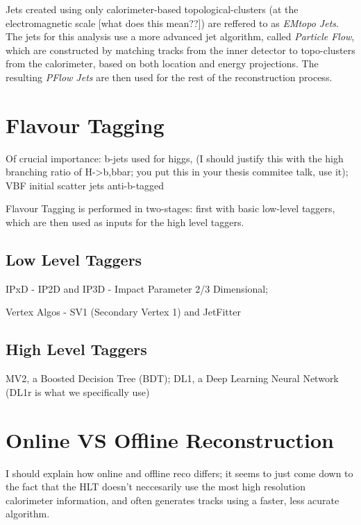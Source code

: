         Jets created using only calorimeter-based topological-clusters (at the electromagnetic scale [what does this mean??]) %
            are reffered to as \textit{EMtopo Jets}.
        The jets for this analysis use a more advanced jet algorithm, called \textit{Particle Flow},
            which are constructed by matching tracks from the inner detector to topo-clusters from the calorimeter,
            based on both location and energy projections.
        The resulting \textit{PFlow Jets} are then used for the rest of the reconstruction process.
        \cite{pflow}
        \cite{jet_energy_scale13TeV}

    \section{Flavour Tagging}
        Of crucial importance:
            b-jets used for higgs,
                (I should justify this with the high branching ratio of H->b,bbar;
                you put this in your thesis commitee talk, use it);
            VBF initial scatter jets anti-b-tagged

        Flavour Tagging is performed in two-stages:
            first with basic low-level taggers,
            which are then used as inputs for the high level taggers.

        \subsection{Low Level Taggers}

            IPxD - IP2D and IP3D - Impact Parameter 2/3 Dimensional; 

            Vertex Algos - SV1 (Secondary Vertex 1) and JetFitter
            \cite{thesis_giacinto}

        \subsection{High Level Taggers}

            MV2, a Boosted Decision Tree (BDT);
            DL1, a Deep Learning Neural Network (DL1r is what we specifically use)
            \cite{bjet_id_and_performance}
            \cite{btagging_optimisation}

    \section{Online VS Offline Reconstruction}
        I should explain how online and offline reco differs;
            it seems to just come down to the fact that the HLT doesn't neccesarily use the most high resolution calorimeter information,
            and often generates tracks using a faster, less acurate algorithm.

